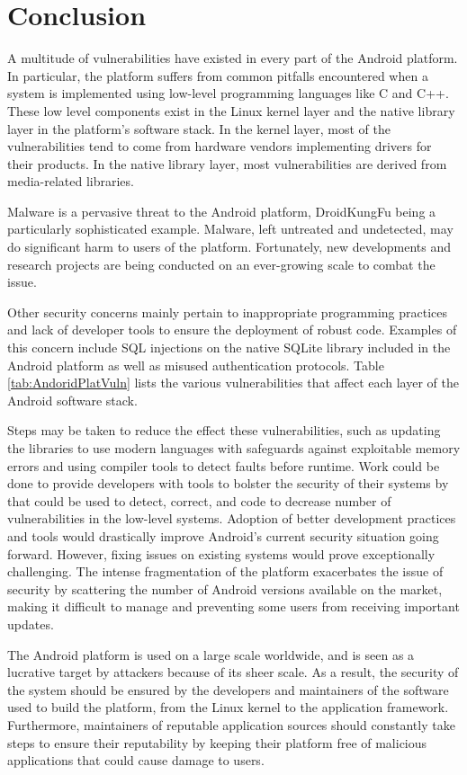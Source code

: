 \section{Conclusion}
A multitude of vulnerabilities have existed in every part of the Android platform.
In particular, the platform suffers from common pitfalls encountered when a system is implemented using low-level programming languages like C and C++.
These low level components exist in the Linux kernel layer and the native library layer in the platform's software stack.
In the kernel layer, most of the vulnerabilities tend to come from hardware vendors implementing drivers for their products.
In the native library layer, most vulnerabilities are derived from media-related libraries.

Malware is a pervasive threat to the Android platform, DroidKungFu being a particularly sophisticated example.
Malware, left untreated and undetected, may do significant harm to users of the platform.
Fortunately, new developments and research projects are being conducted on an ever-growing scale to combat the issue.

Other security concerns mainly pertain to inappropriate programming practices and lack of developer tools to ensure the deployment of robust code.
Examples of this concern include SQL injections on the native SQLite library included in the Android platform as well as misused authentication protocols.
Table \ref{tab:AndoridPlatVuln} lists the various vulnerabilities that affect each layer of the Android software stack.

Steps may be taken to reduce the effect these vulnerabilities, such as updating the libraries to use modern languages with safeguards against exploitable memory errors and using compiler tools to detect faults before runtime.
Work could be done to provide developers with tools to bolster the security of their systems by that could be used to detect, correct, and code to decrease number of vulnerabilities in the low-level systems.
Adoption of better development practices and tools would drastically improve Android's current security situation going forward.
However, fixing issues on existing systems would prove exceptionally challenging.
The intense fragmentation of the platform exacerbates the issue of security by scattering the number of Android versions available on the market, making it difficult to manage and preventing some users from receiving important updates.

The Android platform is used on a large scale worldwide, and is seen as a lucrative target by attackers because of its sheer scale.
As a result, the security of the system should be ensured by the developers and maintainers of the software used to build the platform, from the Linux kernel to the application framework.
Furthermore, maintainers of reputable application sources should constantly take steps to ensure their reputability by keeping their platform free of malicious applications that could cause damage to users.

